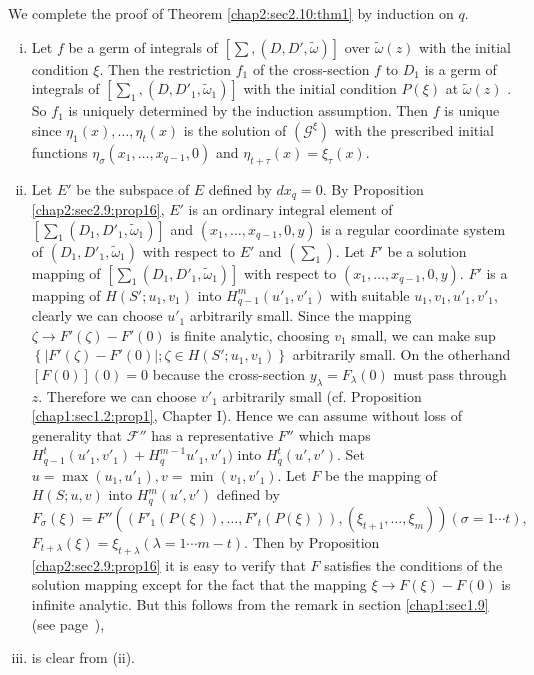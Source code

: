 We complete the proof of Theorem \ref{chap2:sec2.10:thm1} by induction on $q$.
\begin{enumerate}[(i)]
\item Let $f$ be a germ of integrals of  $[\sum, (D, D',
  \tilde{\omega} )]$ over $\tilde{\omega} (z)$ with the initial
  condition $\xi$. Then the restriction $f_1$ of the cross-section $f$
  to $D_1$ is a germ of integrals of $[\sum_1 , (D, D'_1,
    \tilde{\omega}_1)]$ with the initial condition $P (\xi)$ at
  $\tilde{\omega} (z)$ . So $f_1$ is uniquely determined by the
  induction assumption. Then $f$ is unique since $\eta_1 (x), \ldots,
  \eta_t(x)$ is the solution of $(\mathscr{G}^\xi)$ with the
  prescribed initial functions $\eta_\sigma(x_1, \ldots , x_{q-1}, 0)$
  and $\eta_{t + \tau} (x) = \xi_\tau (x)$. 
\item Let $E'$ be the subspace of $E$ defined  by $dx_q=0$. By
  Proposition \ref{chap2:sec2.9:prop16}, $E'$ is an ordinary integral element of $[ \sum_1
    (D_1, D'_1, \tilde{\omega}_1)]$ and $(x_1, \ldots , x_{q-1}, 0,y)$
  is a regular coordinate system of $(D_1, D'_1, \tilde{\omega}_1)$
  with respect to $E'$ and $(\sum_1)$. Let $F'$ be a solution mapping
  of $ [ \sum_1 (D_1, D'_1, \tilde{\omega}_1)] $ with respect to $(x_1
  , \ldots , x_{q-1}, 0 ,y)$. $F'$ is a mapping of $H(S'; u_1, v_1)$
  into $H^m_{q-1}(u'_1, v'_1)$ with suitable $u_1, v_1, u'_1, v'_1$,
  clearly we can  choose $u'_1$ arbitrarily small. Since the mapping
  $\zeta \to F' (\zeta) - F' (0)$ is finite analytic, choosing $v_1$
  small, we can make sup $\left\{\bigg| F' (\zeta ) - F' (0)  \bigg| ;
  \zeta \in H(S';  u_1, v_1)\right\}$ arbitrarily small. On the
  otherhand $[F(0)] (0)=0$ because the cross-section $y_\lambda =
  F_\lambda (0)$ must pass through $z$. Therefore we can choose $v'_1$
  arbitrarily small (cf. Proposition \ref{chap1:sec1.2:prop1}, Chapter I). Hence we can
  assume without loss of generality that $\mathscr{F} ''$ has a
  representative $F''$ which maps\pageoriginale $H^t_{q-1} (u'_1, v'_1) +
  H^{m-1}_qu'_1, v'_1)$ into $H^t_q(u', v')$. Set $u= \max (u_1,
  u'_1), v = \min (v_1, v'_1)$. Let $F$ be the mapping of $H(S; u, v)$
  into $H^m_q(u' ,v')$ defined by  
  $$
  F_\sigma (\xi)  = F'' ((F'_1 (P(\xi)),  \ldots , F'_t(P( \xi))), (
  \xi_{t+1}, \ldots , \xi_m)) (\sigma =1 \cdots t), 
  $$
  $F_{t + \lambda}(\xi) = \xi_{t +  \lambda} (\lambda =1 \cdots
  m-t)$. Then by Proposition \ref{chap2:sec2.9:prop16} it is easy to verify that $F$
  satisfies the conditions of the solution mapping except for the fact
  that the mapping $\xi \to F (\xi) - F(0)$ is infinite analytic. But
  this follows from the remark in section \ref{chap1:sec1.9} (see
  page~\pageref{chap1:sec1.9:rem34}),  
\item is clear from (ii).
\end{enumerate} 
 

